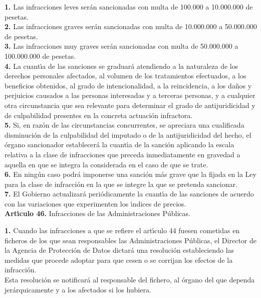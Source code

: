 {\bf 1.} Las infracciones leves ser\'an sancionadas con multa de 100.000
a 10.000.000 de pesetas.\\

{\bf 2.} Las infracciones graves ser\'an sancionadas con multa de
10.000.000 a 50.000.000 de pesetas.\\

{\bf 3.} Las infracciones muy graves ser\'an sancionadas con multa de
50.000.000 a 100.000.000 de pesetas.\\

{\bf 4.} La cuant\'{\i}a de las sanciones se graduar\'a atendiendo
a la naturaleza de los derechos personales afectados, al volumen de
los tratamientos efectuados, a los beneficios obtenidos, al grado de
intencionalidad, a la reincidencia, a los da\~nos y perjuicios causados
a las personas interesadas y a terceras personas, y a cualquier
otra circunstancia que sea relevante para determinar el grado de
antijuridicidad y de culpabilidad presentes en la concreta actuaci\'on
infractora.\\

{\bf 5.} Si, en raz\'on de las circunstancias concurrentes, se apreciara
una cualificada disminuci\'on de la culpabilidad del imputado o de la
antijuridicidad del hecho, el \'organo sancionador establecer\'a la
cuant\'{\i}a de la sanci\'on aplicando la escala relativa a la clase de
infracciones que preceda inmediatamente en gravedad a aquella en que se
integra la considerada en el caso de que se trate.\\

{\bf 6.} En ning\'un caso podr\'a imponerse una sanci\'on m\'as grave que
la fijada en la Ley para la clase de infracci\'on en la que se integre
la que se pretenda sancionar.\\

{\bf 7.} El Gobierno actualizar\'a peri\'odicamente la cuant\'{\i}a
de las sanciones de acuerdo con las variaciones que experimenten los
\'{\i}ndices de precios.  \vspace{0.3cm}\\ {\large {\bf Art\'{\i}culo 46.}
Infracciones de las Administraciones P\'ublicas.}

{\bf 1.} Cuando las infracciones a que se refiere el art\'{\i}culo
44 fuesen cometidas en ficheros de los que sean responsables las
Administraciones P\'ublicas, el Director de la Agencia de Protecci\'on de
Datos dictar\'a una resoluci\'on estableciendo las medidas que procede
adoptar para que cesen o se corrijan los efectos de la infracci\'on.\\
Esta resoluci\'on se notificar\'a al responsable del fichero, al \'organo
del que dependa jer\'arquicamente y a los afectados si los hubiera.\\

